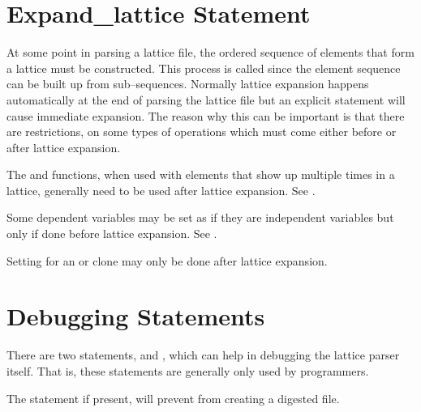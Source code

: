 {%
\section{Expand\_lattice Statement}
\label{s:lat_expand}

At some point in parsing a lattice file, the ordered sequence of
elements that form a lattice must be constructed. This process is
called  since the element sequence can be built
up from sub--sequences. Normally lattice expansion happens
automatically at the end of parsing the lattice file but an explicit
 statement will cause immediate expansion. The
reason why this can be important is that there are restrictions, on
some types of operations which must come either before or after
lattice expansion. 
\begin{Itemize}
\item 
{}
The  and  functions, when used with elements
that show up multiple times in a lattice, generally need to be used
after lattice expansion. See .
\item 
Some dependent variables may be set as if they are independent
variables but only if done before lattice expansion. See
.
\item 
Setting  for an  or  clone may only
be done after lattice expansion.
\end{Itemize}

\section{Debugging Statements}

There are two statements,  and ,
which can help in debugging the \bmad lattice parser
itself.  That is, these statements are generally only used by programmers.

The  statement if present, will prevent \bmad from 
creating a digested file. 

}
